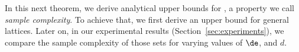 In this next theorem, we derive analytical upper bounds for \Lattices, a property we call \emph{sample complexity}. To achieve that, we first derive an upper bound for general lattices. Later on, in our experimental results (Section~\ref{sec:experiments}), we compare the sample complexity of those sets for varying values of $\de$, and $d$. 


